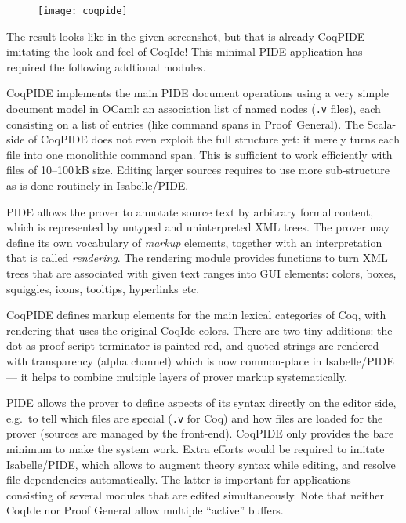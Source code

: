 \begin{isabellebody}
\begin{isamarkuptext}
  \begin{figure}[htb]
  \centering
  \texttt{[image: coqpide]}
  \end{figure}
  
  \noindent The result looks like in the given screenshot, but that is
  already CoqPIDE imitating the look-and-feel of CoqIde! This minimal
  PIDE application has required the following addtional modules.

   CoqPIDE implements the main PIDE
  document operations using a very simple document model in OCaml: an
  association list of named nodes (\verb,.v, files), each consisting
  on a list of entries (like command spans in Proof~General).  The
  Scala-side of CoqPIDE does not even exploit the full structure yet:
  it merely turns each file into one monolithic command span.  This is
  sufficient to work efficiently with files of 10--100\,kB size.
  Editing larger sources requires to use more sub-structure as is done
  routinely in Isabelle/PIDE.

    PIDE allows the prover to annotate
  source text by arbitrary formal content, which is represented by
  untyped and uninterpreted XML trees.  The prover may define its own
  vocabulary of \emph{markup} elements, together with an
  interpretation that is called \emph{rendering}.  The rendering
  module provides functions to turn XML trees that are associated with
  given text ranges into GUI elements: colors, boxes, squiggles,
  icons, tooltips, hyperlinks etc.

  CoqPIDE defines markup elements for the main lexical categories of
  Coq, with rendering that uses the original CoqIde colors.  There are
  two tiny additions: the dot as proof-script terminator is painted
  red, and quoted strings are rendered with transparency (alpha
  channel) which is now common-place in Isabelle/PIDE --- it helps to
  combine multiple layers of prover markup systematically.

   PIDE allows the prover to define aspects
  of its syntax directly on the editor side, e.g.\ to tell which files
  are special (\verb,.v, for Coq) and how files are loaded for the
  prover (sources are managed by the front-end).  CoqPIDE only
  provides the bare minimum to make the system work.  Extra efforts
  would be required to imitate Isabelle/PIDE, which allows to augment
  theory syntax while editing, and resolve file dependencies
  automatically.  The latter is important for applications consisting
  of several modules that are edited simultaneously.  Note that
  neither CoqIde nor Proof General allow multiple ``active'' buffers.


\end{isamarkuptext}
\end{isabellebody}
